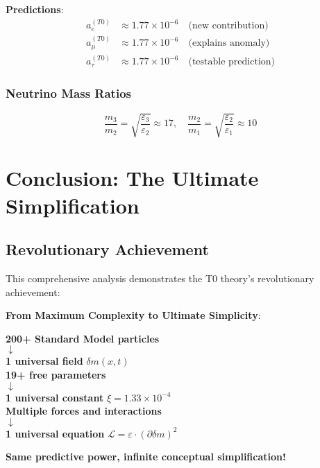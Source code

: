 \documentclass[12pt,a4paper]{article}
\newcommand{\deltam}{\delta m}
\newcommand{\xipar}{\xi}
\newcommand{\Lag}{\mathcal{L}}
\begin{document}
	\textbf{Predictions}:
	\begin{align}
		a_e^{(T0)} &\approx 1.77 \times 10^{-6} \quad \text{(new contribution)} \\
		a_\mu^{(T0)} &\approx 1.77 \times 10^{-6} \quad \text{(explains anomaly)} \\
		a_\tau^{(T0)} &\approx 1.77 \times 10^{-6} \quad \text{(testable prediction)}
	\end{align}
	
	\subsubsection{Neutrino Mass Ratios}
	
	\begin{equation}
		\frac{m_3}{m_2} = \sqrt{\frac{\varepsilon_3}{\varepsilon_2}} \approx 17, \quad \frac{m_2}{m_1} = \sqrt{\frac{\varepsilon_2}{\varepsilon_1}} \approx 10
		\label{eq:neutrino_mass_ratios}
	\end{equation}
	
	\section{Conclusion: The Ultimate Simplification}
	
	\subsection{Revolutionary Achievement}
	
	This comprehensive analysis demonstrates the T0 theory's revolutionary achievement:
	
	\begin{tcolorbox}[colback=green!5!white,colframe=green!75!black,title=The Complete Unification]
		\textbf{From Maximum Complexity to Ultimate Simplicity}:
		
		\begin{center}
			\textbf{200+ Standard Model particles} \\
			$\downarrow$ \\
			\textbf{1 universal field} $\deltam(x,t)$ \\[1em]
			
			\textbf{19+ free parameters} \\
			$\downarrow$ \\
			\textbf{1 universal constant} $\xipar = 1.33 \times 10^{-4}$ \\[1em]
			
			\textbf{Multiple forces and interactions} \\
			$\downarrow$ \\
			\textbf{1 universal equation} $\Lag = \varepsilon \cdot (\partial \deltam)^2$
		\end{center}
		
		\textbf{Same predictive power, infinite conceptual simplification!}
	\end{tcolorbox}
	
\end{document}
